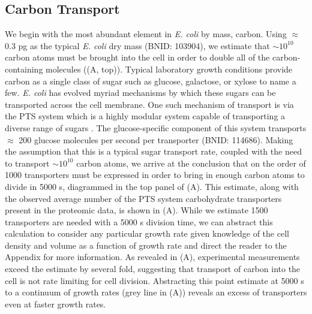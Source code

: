 \subsection{Carbon Transport}
We begin with the most abundant element in \textit{E. coli} by mass, carbon.
Using $\approx$ 0.3 pg as the typical \textit{E. coli} dry mass (BNID: 103904),
we estimate that $\sim 10^{10}$ carbon atoms must be brought into the cell in
order to double all of the carbon-containing molecules ((A,
top)). Typical laboratory growth conditions provide carbon as a single class of
sugar such as glucose, galactose, or xylose to name a few. \textit{E. coli} has
evolved myriad mechanisms by which these sugars can be transported across the
cell membrane. One such mechanism of transport is via the PTS system which is a
highly modular system capable of transporting a diverse range of sugars
\citep{escalante2012}. The glucose-specific component of this system transports
$\approx$ 200 glucose molecules per second per transporter (BNID: 114686).
Making the assumption that this is a typical sugar transport rate, coupled with
the need to transport $\sim 10^{10}$ carbon atoms, we arrive at the conclusion
that on the order of 1000 transporters must be expressed in order to bring in
enough carbon atoms to divide in 5000 s, diagrammed in the top panel of
(A). This estimate, along with the observed average number of
the PTS system carbohydrate transporters present in the proteomic data, is shown
in (A). While we estimate 1500 transporters are needed with a
5000 s division time, we can abstract this calculation to consider any
particular growth rate given knowledge of the cell density and volume as a
function of growth rate and direct the reader to the Appendix
 for more information. As revealed in
(A), experimental measurements exceed the estimate by several
fold, suggesting that transport of carbon into the cell is not rate limiting for
cell division. Abstracting this point estimate at 5000 s to a continuum of
growth rates (grey line in (A)) reveals an excess of
transporters even at faster growth rates.

